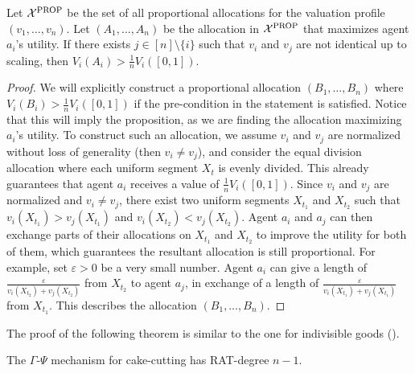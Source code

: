 \begin{propositionrep} \label{prop:strictlymorethanproportional}
    Let $\mathcal{X}^{\mathrm{PROP}}$ be the set of all proportional allocations for the valuation profile $(v_1,\ldots,v_n)$.
    Let $(A_1,\ldots,A_n)$ be the allocation in $\mathcal{X}^{\mathrm{PROP}}$ that maximizes agent $a_i$'s utility.
    If there exists $j\in[n]\setminus\{i\}$ such that $v_i$ and $v_j$ are not identical up to scaling, then $V_i(A_i)>\frac1nV_i([0,1])$.
\end{propositionrep}
\begin{proof}
    We will explicitly construct a proportional allocation $(B_1,\ldots,B_n)$ where $V_i(B_i)>\frac1nV_i([0,1])$ if the pre-condition in the statement is satisfied.
    Notice that this will imply the proposition, as we are finding the allocation maximizing $a_i$'s utility.
    To construct such an allocation, we assume $v_i$ and $v_j$ are normalized without loss of generality (then $v_i\neq v_j$), and consider the equal division allocation where each uniform segment $X_t$ is evenly divided.
    This already guarantees that agent $a_i$ receives a value of $\frac1nV_i([0,1])$.
    Since $v_i$ and $v_j$ are normalized and $v_i\neq v_j$, there exist two uniform segments $X_{t_1}$ and $X_{t_2}$ such that $v_i(X_{t_1})>v_j(X_{t_1})$ and $v_i(X_{t_2})<v_j(X_{t_2})$.
    Agent $a_i$ and $a_j$ can then exchange parts of their allocations on $X_{t_1}$ and $X_{t_2}$ to improve the utility for both of them, which guarantees the resultant allocation is still proportional.
    For example, set $\varepsilon>0$ be a very small number.
    Agent $a_i$ can give a length of $\frac{\varepsilon}{v_i(X_{t_2})+v_j(X_{t_2})}$ from $X_{t_2}$ to agent $a_j$, in exchange of a length of $\frac{\varepsilon}{v_i(X_{t_1})+v_j(X_{t_1})}$ from $X_{t_1}$.
    This describes the allocation $(B_1,\ldots,B_n)$.
\end{proof}

The proof of the following theorem is similar to the one for indivisible goods (). 
\begin{theoremrep}
    The $\Gamma$-$\Psi$ mechanism for cake-cutting has RAT-degree $n-1$.
\end{theoremrep}



